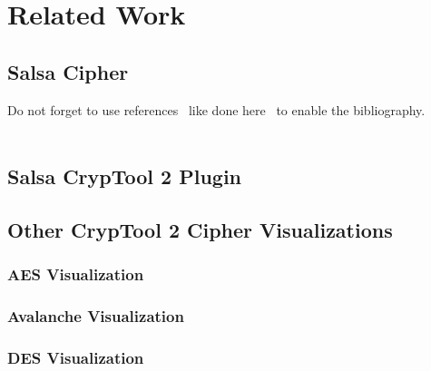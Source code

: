 \chapter{Related Work}
\label{sec:relatedWork}
\section{Salsa Cipher}
\label{sec:salsaCipher}

Do not forget to use references~\cite{AESVisualization} like done here~\cite{AvalancheVisualization} to enable the bibliography.
~\cite{rfc8439}
~\cite{salsaspec}
~\cite{chachaspec}
~\cite{salsasec}
\blindtext[3]


\section{Salsa CrypTool 2 Plugin}
\label{sec:salsaCT2Plugin}
\blindtext[2]

\section{Other CrypTool 2 Cipher Visualizations}
\label{sec:otherCT2CipherVisualizations}

\subsection{AES Visualization}
\label{sec:aesVisualization}

\blindtext[2]

\blindtext[2]

\subsection{Avalanche Visualization}
\label{sec:avalancheVisualization}

\blindtext[2]

\subsection{DES Visualization}
\label{sec:desVisualization}

\blindtext[2]
